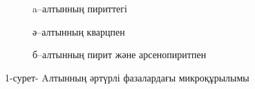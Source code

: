 \begin{figure}[H]
    \centering
    \begin{subfigure}[t]{0.32\textwidth}
        \centering
        \caption*{a--алтынның пириттегі}
    \end{subfigure}
    \hfill
    \begin{subfigure}[t]{0.32\textwidth}
        \centering
        \caption*{ә--алтынның кварцпен}
    \end{subfigure}
    \hfill
    \begin{subfigure}[t]{0.32\textwidth}
        \centering
        \caption*{б--алтынның пирит және арсенопиритпен}
    \end{subfigure}
    \caption*{1-сурет- Aлтынның әртүрлі фазалардағы микроқұрылымы}
\end{figure}


